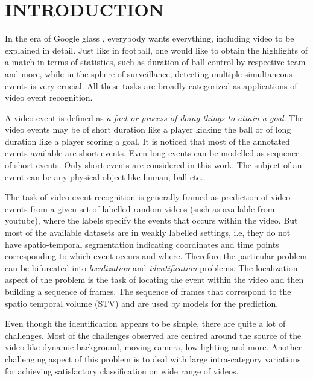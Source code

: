 \chapter{INTRODUCTION}
\label{chap:intro}
In the era of Google glass \citep{googleGlass}, %
everybody wants everything, including video to be explained in detail.  Just like in football, one would like to obtain the highlights of a match in terms of statistics, such as duration of ball control by respective team and more,  while in the sphere of surveillance, detecting multiple simultaneous events is very crucial.  All these tasks are broadly categorized as applications	 of video event recognition. 

\par A video event is defined as \textit{a fact or process of doing things to attain a goal}.  The video events may be of short duration like a player kicking the ball or of long duration like a player scoring a goal.  It is noticed that most of the annotated events available are short events. Even long events can be modelled as sequence of short events.  Only short events are considered in this work. The subject of an event can be any physical object like human, ball etc..
\par The task of video event recognition is generally framed as prediction of video events from a given set of labelled random videos (such as available from youtube), where the labels specify the events that occurs within the video.  But most of the available datasets are in weakly labelled settings, i.e, they do not have spatio-temporal segmentation indicating coordinates and time points corresponding to which event occurs and where.  Therefore the particular problem can be bifurcated into \textit{localization} and \textit{identification} problems.  The localization aspect of the problem is the task of locating the event within the video %
and then building a sequence of frames.  The sequence of frames that correspond to the spatio temporal volume (STV) and are used by models for the prediction.
\par Even though the identification appears to be simple, there are quite a lot of challenges.  Most of the challenges observed are centred around the source of the video like dynamic background, moving camera, low lighting and more.  Another challenging aspect of this problem is to deal with large intra-category variations for achieving satisfactory classification on wide range of videos.
